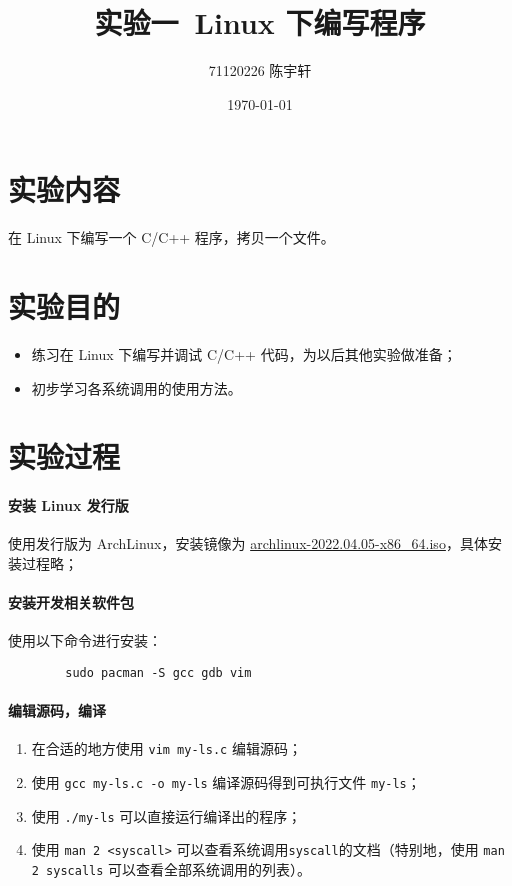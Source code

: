 \documentclass{ctexart}
\title{实验一~Linux 下编写程序}
\author{71120226 陈宇轩}
\date{\today}
\begin{document}
    \maketitle

    \section{实验内容}

    在 Linux 下编写一个 C/C++ 程序，拷贝一个文件。

    \section{实验目的}

    \begin{itemize}
        \item 练习在 Linux 下编写并调试 C/C++ 代码，为以后其他实验做准备；
        \item 初步学习各系统调用的使用方法。 
    \end{itemize}

    \section{实验过程}

    \paragraph{安装 Linux 发行版} 使用发行版为 ArchLinux，安装镜像为 \href{https://mirrors.tuna.tsinghua.edu.cn/archlinux/iso/latest/archlinux-2022.04.05-x86_64.iso}{archlinux-2022.04.05-x86\_64.iso}，具体安装过程略；

    \paragraph{安装开发相关软件包} 使用以下命令进行安装：

    \begin{verbatim}
        sudo pacman -S gcc gdb vim
    \end{verbatim}

    \paragraph{编辑源码，编译}
    
    \begin{enumerate}
        \item 在合适的地方使用 \texttt{vim my-ls.c} 编辑源码；
        \item 使用 \texttt{gcc my-ls.c -o my-ls} 编译源码得到可执行文件 \texttt{my-ls}；
        \item 使用 \texttt{./my-ls} 可以直接运行编译出的程序；
        \item 使用 \texttt{man 2 <syscall>} 可以查看系统调用\verb|syscall|的文档（特别地，使用 \verb|man 2 syscalls| 可以查看全部系统调用的列表）。
    \end{enumerate}
\end{document}
